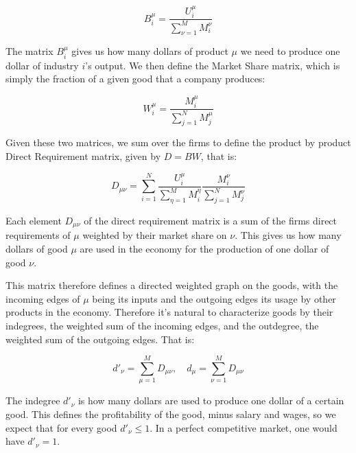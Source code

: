 \begin{equation}
  \label{eq:dr_ic}
  B_i^\mu = \frac{U_i^\mu}{\sum_{\nu=1}^M M_i^\nu}
\end{equation}

The matrix $B_i^\mu$ gives us how many dollars of product $\mu$ we need to
produce one dollar of industry $i$'s output. We then define the
Market Share matrix, which is simply the fraction
of a given good that a company produces:

\begin{equation}
  \label{eq:market_share}
  W_i^\mu = \frac{M_i^\mu}{\sum_{j=1}^N M_j^\mu}
\end{equation}

Given these two matrices, we sum over the firms to define the product by product Direct
Requirement matrix, given by $D = B W$, that is:

\begin{equation}
  \label{eq:D}
  D_{\mu\nu} = \sum_{i=1}^N \frac{U_i^\mu}{\sum_{\eta=1}^M M_i^\eta} \frac{M_i^\nu}{\sum_{j=1}^N M_j^\nu}
\end{equation}

Each element $D_{\mu\nu}$ of the direct requirement matrix is a sum of
the firms direct requirements of $\mu$ weighted by their market share
on $\nu$. This gives us how many dollars of good $\mu$ are used in the
economy for the production of one dollar of good $\nu$.

This matrix therefore defines a directed weighted
graph on the goods, with the incoming edges of $\mu$ being its inputs
and the outgoing edges its usage by other products in the
economy. Therefore it's natural to characterize goods by their
indegrees, the weighted sum of the incoming edges, and the outdegree,
the weighted sum of the outgoing edges. That is:

\begin{equation}
  \label{eq:1}
 d'_\nu = \sum_{\mu=1}^M D_{\mu\nu},  \quad  d_\mu = \sum_{\nu = 1}^M D_{\mu\nu}
\end{equation}

The indegree $d'_\nu$ is how many dollars are used to produce one
dollar of a certain good. This defines the profitability of the good,
minus salary and wages, so we expect that for every good $d'_\nu \leq
1$. In a perfect competitive market, one would have $d'_\nu = 1$.

